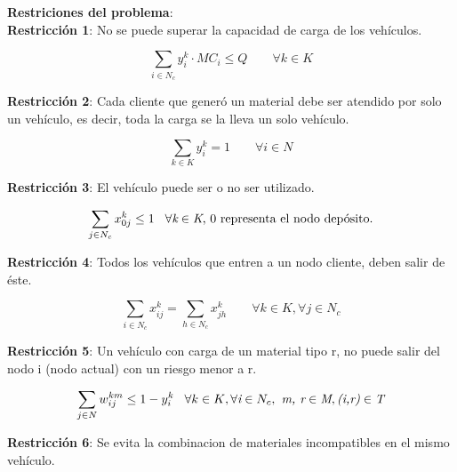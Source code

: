 \documentclass[conference]{IEEEtran}
\begin{document}
\textbf{Restriciones del problema}:
\\

\textbf{Restricci\'on 1}: No se puede superar la capacidad de carga de los veh\'iculos.

    \begin{equation}
           \sum_{i \in N_c}  y^{k}_{i} \cdot MC_i \leq Q \qquad \forall \textit{k} \in \textit{K}
    \end{equation}

\textbf{Restricci\'on 2}: Cada cliente que gener\'o un material debe ser atendido por solo un veh\'iculo, es decir, toda la carga se la lleva un solo veh\'iculo.

    \begin{equation}
           \sum_{k \in K}  y^{k}_{i} = 1 \qquad \forall \textit{i} \in \textit{N}
    \end{equation}

\textbf{Restricci\'on 3}: El veh\'iculo puede ser o no ser utilizado.

    \begin{equation}
           \sum_{j \in N_c}  x^{k}_{0j} \leq 1 \hspace{0.3cm}  \forall \textit{k} \in \textit{K} \text{, 0 representa el nodo dep\'osito.}
    \end{equation}

\textbf{Restricci\'on 4}: Todos los veh\'iculos que entren a un nodo cliente, deben salir de \'este.

    \begin{equation}
           \sum_{i \in N_c}  x^{k}_{ij} = \sum_{h \in N_c} x^{k}_{jh} \qquad \forall \textit{$k$} \in \textit{$K$}, \forall \textit{j} \in \textit{$N_c$}
    \end{equation}


\textbf{Restricci\'on 5}: Un veh\'iculo con carga de un material tipo r, no puede salir del nodo i (nodo actual) con un riesgo menor a r.

    \begin{equation}
           \sum_{j \in N}  w^{km}_{ij} \leq 1 -  y^{k}_{i} \hspace{0.3cm} \forall \textit{$k$} \in \textit{$K$}, \forall \textit{i} \in \textit{$N_c$}, 
           \textit{ m, r} \in \textit{M}, \textit{(i,r)} \in \textit{T}
    \end{equation}

\textbf{Restricci\'on 6}: Se evita la combinacion de materiales incompatibles en el mismo veh\'iculo.
\end{document}
